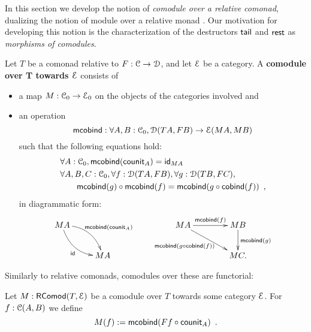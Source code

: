 \documentclass[a4paper,USenglish]{lipics}
\newcommand{\parencite}[1]{\cite{#1}}
\newcommand{\fat}[1]{\textbf{#1}}
\begin{document}
In this section we develop the notion of \emph{comodule over a relative comonad}, dualizing the notion of module over a relative monad \parencite{ahrens_relmonads}.
Our motivation for developing this notion is the characterization of the destructors $\stail$ and $\tail$ as \emph{morphisms of comodules}.

\begin{definition}%
\label{def:comodule}
 Let $T$ be a comonad relative to $F:\C\to\D$, and let $\E$ be a category.
 A \fat{comodule over T towards $\E$} consists of
   \begin{itemize}
   \item a map $M:\C_0 \to \E_0$ on the objects of the categories involved and
   \item an operation \[\mcobind: \forall A,B:\C_0, \D(TA,FB) \to \E(MA,MB)\] such that the following equations hold:
 \begin{align}
 &  \forall A : \C_0, \mcobind(\counit_A) = \id_{MA} \\
 & \forall A,B,C:\C_0, \forall f : \D(TA,FB),\forall g:\D(TB,FC), \notag\\
 &   \qquad      \comp{\mcobind(f)}{\mcobind(g)} = \mcobind(\comp{\cobind(f)}{g}) \enspace ,
 \end{align}
  in diagrammatic form:
\[
    \begin{xy}
    \xymatrix{
                       MA \ar@/^1pc/[rd]^{\mcobind(\counit_A)} \ar@/_1pc/[rd]_{\id}& \\
                          & MA
    }
   \end{xy}
   \qquad
   \begin{xy}
    \xymatrix@C=4em{
       MA \ar[r]^{\mcobind(f)} \ar[rd]_{\mcobind(\comp{\cobind(f)}{g})\;\;\;\;\;}& MB \ar[d]^{\mcobind(g)} \\
          & MC .
    }
   \end{xy}
\]  
  
  
  \end{itemize}

\end{definition}


Similarly to relative comonads, comodules over these are functorial:
\begin{definition}
\label{def:comodule_lift}
 Let $M : \RComod(T,\E)$ be a comodule over $T$ towards some category $\E$. For $f : \C(A,B)$ we define
  \[ M(f) := \mcobind(\comp{\counit_A}{Ff}) \enspace .  \]
\end{definition}
\end{document}
